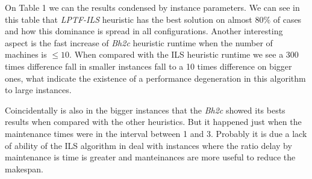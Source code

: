 \documentclass[a4paper,11pt]{article}
\begin{document}
On Table 1 we can the results condensed by instance parameters. We can see in this table that \emph{LPTF-ILS} heuristic has the best solution on almost $80\%$ of cases and how this dominance is spread in all configurations. Another interesting aspect is the fast increase of \emph{Bh2c} heuristic runtime when the number of machines is $\leq 10$. When compared with the ILS heuristic runtime we see a 300 times difference fall in smaller instances fall to a 10 times difference on bigger ones, what indicate the existence of a performance degeneration in this algorithm to large instances.

Coincidentally is also in the bigger instances that the \emph{Bh2c} showed its bests  results when compared with the other heuristics. But it happened just when the maintenance times were in the interval between 1 and 3. Probably it is due a lack of ability of the ILS algorithm in deal with instances where the ratio delay by maintenance  is time is greater and manteinances are more useful to reduce the makespan.  
\end{document}
